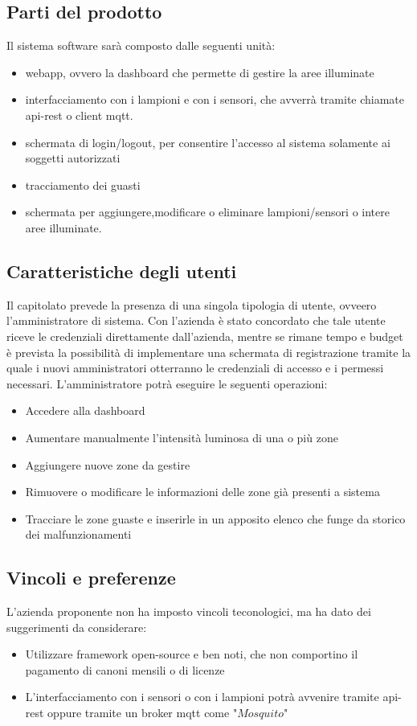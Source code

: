 \documentclass[12pt]{article}
\begin{document}
\subsection{Parti del prodotto}
Il sistema software sarà composto dalle seguenti unità:
\begin{itemize}
	\item webapp, ovvero la dashboard che permette di gestire la aree illuminate
	\item interfacciamento con i lampioni e con i sensori, che avverrà tramite chiamate api-rest o client mqtt.
	\item schermata di login/logout, per consentire l'accesso al sistema solamente ai soggetti autorizzati
	\item tracciamento dei guasti
	\item schermata per aggiungere,modificare o eliminare lampioni/sensori o intere aree illuminate.
\end{itemize}
\subsection{Caratteristiche degli utenti}
Il capitolato prevede la presenza di una singola tipologia di utente, ovveero l'amministratore di sistema. Con l'azienda è stato concordato che tale utente riceve le credenziali direttamente dall'azienda, mentre se rimane tempo e budget è prevista la possibilità di implementare una schermata di registrazione tramite la quale i nuovi amministratori otterranno le credenziali di accesso e i permessi necessari.
L'amministratore potrà eseguire le seguenti operazioni:
\begin{itemize}
	\item Accedere alla dashboard
	\item Aumentare manualmente l'intensità luminosa di una o più zone
	\item Aggiungere nuove zone da gestire
	\item Rimuovere o modificare le informazioni delle zone già presenti a sistema
	\item Tracciare le zone guaste e inserirle in un apposito elenco che funge da storico dei malfunzionamenti
\end{itemize}

\subsection{Vincoli e preferenze}
L'azienda proponente non ha imposto vincoli teconologici, ma ha dato dei suggerimenti da considerare:
\begin{itemize}
	\item Utilizzare framework open-source e ben noti, che non comportino il pagamento di canoni mensili o di licenze
	\item L'interfacciamento con i sensori o con i lampioni potrà avvenire tramite api-rest oppure tramite un broker mqtt come "$Mosquito$"
\end{itemize}
\end{document}
